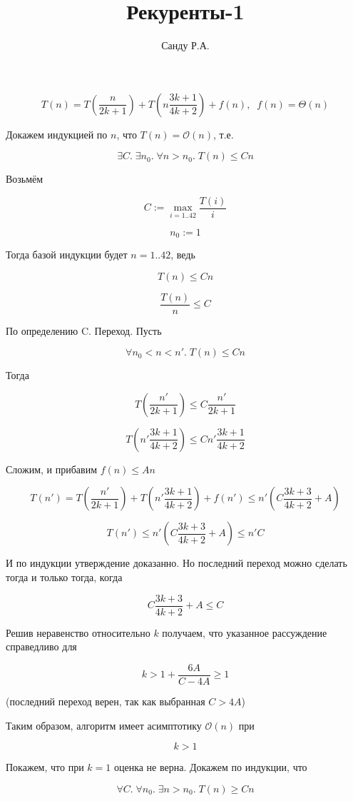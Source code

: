 \documentclass[11pt]{article}
\title{Рекуренты-1}
\author{Санду Р.А.}
\begin{document}
\maketitle

\[
	T\left(n\right)=T\left(\frac{n}{2k+1}\right)+T\left(n\frac{3k+1}{4k+2}\right) + f\left(n\right),\;\;f\left(n\right) 
		= \Theta\left(n\right)
\]

Докажем индукцией по $n$, что $T\left(n\right) = \mathcal{O}\left(n\right)$, т.е.

\[
	\exists C.\;\exists n_0.\;\forall n>n_0.\;T(n)\leq Cn
\]

Возьмём

\[
	C := \max_{i=1..42}\frac{T(i)}{i}
\]

\[
	n_0 := 1
\]

Тогда базой индукции будет $n = 1..42$, ведь

\[
	T(n) \leq Cn
\]

\[
	\frac{T(n)}{n} \leq C
\]

По определению C. Переход. Пусть

\[
	\forall n_0<n< n'.\;T(n)\leq Cn
\]

Тогда

\[
	T\left( \frac{n'}{2k+1} \right) \leq C\frac{n'}{2k+1}
\]


\[
	T\left( n'\frac{3k+1}{4k+2} \right) \leq Cn'\frac{3k+1}{4k+2}
\]

Сложим, и прибавим $f(n) \leq An$

\[
	T(n') = T\left( \frac{n'}{2k+1} \right) + T\left( n'\frac{3k+1}{4k+2} \right) + f(n') \leq n'\left( C\frac{3k+3}{4k+2}+A\right)
\]


\[
	T(n') \leq n'\left( C\frac{3k+3}{4k+2}+A\right) \leq n'C
\]

И по индукции утверждение доказанно. Но последний переход можно сделать тогда и только тогда, когда

\[
	C\frac{3k+3}{4k+2}+A \leq C
\]

Решив неравенство относительно $k$ получаем, что указанное  рассуждение справедливо для

\[
	k > 1 + \frac{6A}{C-4A} \geq 1
\]

(последний переход верен, так как выбранная $C > 4A$)

Таким образом, алгоритм имеет асимптотику $\mathcal{O}(n)$ при

\[
	k > 1
\]

Покажем, что при $k=1$ оценка не верна. Докажем по индукции, что

\[
	\forall C.\;\forall n_0.\;\exists n>n_0.\;T(n) \geq Cn
\]
\end{document}
